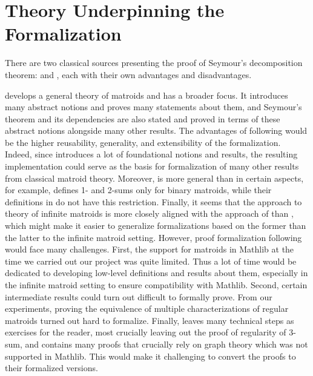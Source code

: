 \section{Theory Underpinning the Formalization}

There are two classical sources presenting the proof of Seymour's decomposition theorem: \cite{Oxley2011} and \cite{Truemper2016}, each with their own advantages and disadvantages.

\citeauthor{Oxley2011} \cite{Oxley2011} develops a general theory of matroids and has a broader focus. It introduces many abstract notions and proves many statements about them, and Seymour's theorem and its dependencies are also stated and proved in terms of these abstract notions alongside many other results. The advantages of following \cite{Oxley2011} would be the higher reusability, generality, and extensibility of the formalization. Indeed, since \cite{Oxley2011} introduces a lot of foundational notions and results, the resulting implementation could serve as the basis for formalization of many other results from classical matroid theory. Moreover, \cite{Oxley2011} is more general than \cite{Truemper2016} in certain aspects, for example, \cite{Truemper2016} defines 1- and 2-sums only for binary matroids, while their definitions in \cite{Oxley2011} do not have this restriction. Finally, it seems that the approach to theory of infinite matroids \cite{Bruhn2013} is more closely aligned with the approach of \cite{Oxley2011} than \cite{Truemper2016}, which might make it easier to generalize formalizations based on the former than the latter to the infinite matroid setting. However, proof formalization following \cite{Oxley2011} would face many challenges. First, the support for matroids in Mathlib \cite{Mathlib} at the time we carried out our project was quite limited. Thus a lot of time would be dedicated to developing low-level definitions and results about them, especially in the infinite matroid setting to ensure compatibility with Mathlib. Second, certain intermediate results could turn out difficult to formally prove. From our experiments, proving the equivalence of multiple characterizations of regular matroids turned out hard to formalize. Finally, \cite{Oxley2011} leaves many technical steps as exercises for the reader, most crucially leaving out the proof of regularity of 3-sum, and contains many proofs that crucially rely on graph theory which was not supported in Mathlib. This would make it challenging to convert the proofs to their formalized versions.

